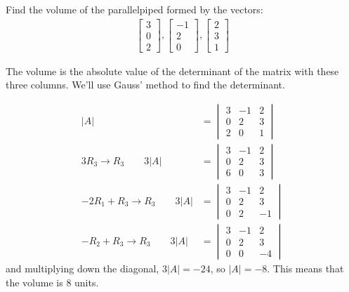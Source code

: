 \begin{example}
Find the volume of the parallelpiped formed by the vectors:
%
\begin{align*}
\begin{bmatrix}
3 \\ 0 \\ 2
\end{bmatrix}, \begin{bmatrix}
-1 \\ 2 \\ 0
\end{bmatrix}, \begin{bmatrix}
2 \\ 3 \\ 1
\end{bmatrix}
\end{align*}

\solution

The volume is the absolute value of the determinant of the matrix with these three columns.  We'll use Gauss' method to find the determinant.

%
\begin{align*}
|A| &= \begin{vmatrix}
3 & -1 & 2 \\
0 & 2 & 3 \\
2 & 0 & 1
\end{vmatrix} \\
3R_3 \rightarrow R_3 \qquad
3|A| &= \begin{vmatrix}
3 & -1 & 2 \\
0 & 2 & 3 \\
6 & 0 & 3
\end{vmatrix} \\
-2 R_1 + R_3 \rightarrow R_3 \qquad
3|A| &= \begin{vmatrix}
3 & -1 & 2 \\
0 & 2 & 3 \\
0 & 2 & -1
\end{vmatrix} \\
-R_2 + R_3 \rightarrow R_3 \qquad
3|A| &= \begin{vmatrix}
3 & -1 & 2 \\
0 & 2 & 3 \\
0 & 0 & -4
\end{vmatrix}
\end{align*}
and multiplying down the diagonal,  $3|A| = -24$, so $|A|=-8$.  This means that the volume is 8 units.
\end{example}

\vfill \pagebreak
